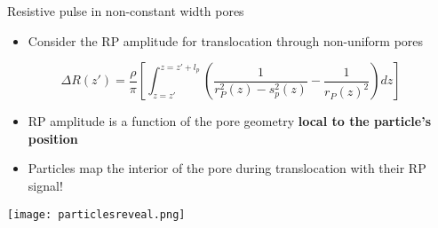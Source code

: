 
\begin{frame}[c]{Resistive pulse in non-constant width pores}
	\begin{itemize}
		\item Consider the RP amplitude for translocation through non-uniform pores
	\end{itemize}
	$$ \Delta R\left(z'\right)=\frac{\rho}{\pi}\left[\int_{z=z'}^{z=z'+l_{p}}\left(\frac{1}{r_{P}^{2}\left(z\right)-s_{p}^{2}\left(z\right)}-\frac{1}{r_{P}\left(z\right)^{2}}\right)dz\right] $$
	\begin{itemize}
		\item RP amplitude is a function of the pore geometry \textbf{local to the particle's position}
		\item Particles map the interior of the pore during translocation with their RP signal!
	\end{itemize}
	
	{\centering
		\texttt{[image: particlesreveal.png]} \\
		\par
	}

	
\end{frame}




